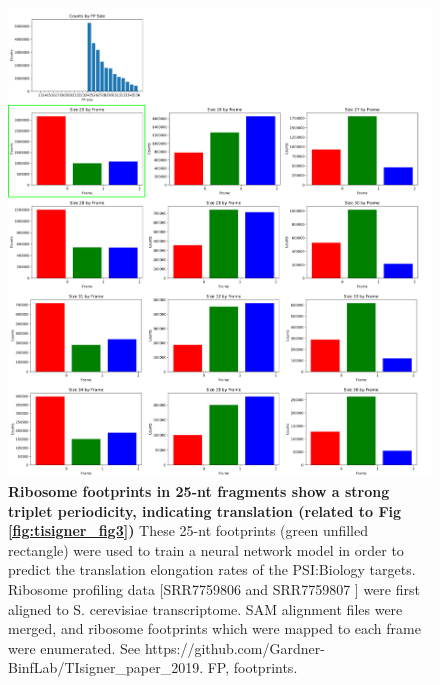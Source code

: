 \begin{figure}[htbp!]
	\center
	\includegraphics[width=1\textwidth]{appendix/TIsigner/Figs/S8.png}
	\caption[Ribosome footprints in 25-nt fragments show a strong triplet periodicity, indicating translation (related to Fig \ref{fig:tisigner_fig3})]{\textbf{Ribosome footprints in 25-nt fragments show a strong triplet periodicity, indicating translation (related to Fig \ref{fig:tisigner_fig3})}  These 25-nt footprints (green unfilled rectangle) were used to train a neural network model \cite{Tunney2018-kk} in order to predict the translation elongation rates of the PSI:Biology targets. Ribosome profiling data [SRR7759806 and SRR7759807 \cite{Mohammad2019-if}] were first aligned to S. cerevisiae transcriptome. SAM alignment files were merged, and ribosome footprints which were mapped to each frame were enumerated. See https://github.com/Gardner-BinfLab/TIsigner\_paper\_2019. FP, footprints. 
	}%
	\label{fig:appendix_TIsigner_S8}
\end{figure}

